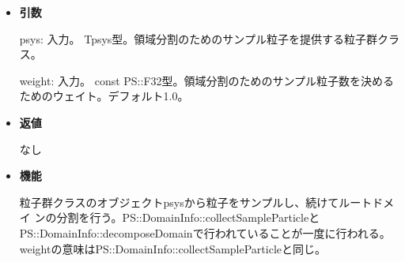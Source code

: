 \begin{itemize}

\item {\bf 引数}

psys: 入力。 Tpsys型。領域分割のためのサンプル粒子を提供する粒子群クラ
ス。

weight: 入力。 const PS::F32型。領域分割のためのサンプル粒子数を決める
ためのウェイト。デフォルト1.0。

\item {\bf 返値}

なし

\item {\bf 機能}

粒子群クラスのオブジェクトpsysから粒子をサンプルし、続けてルートドメイ
ンの分割を行う。PS::DomainInfo::collectSampleParticleと
PS::DomainInfo::decomposeDomainで行われていることが一度に行われる。
weightの意味はPS::DomainInfo::collectSampleParticleと同じ。

\end{itemize}


